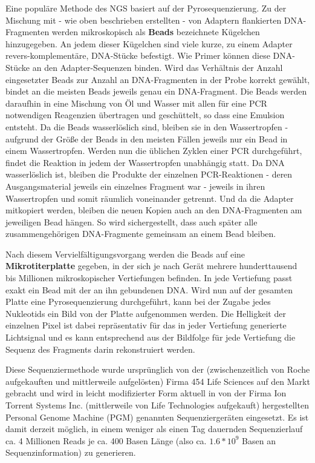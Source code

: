 Eine populäre Methode des NGS basiert auf der Pyrosequenzierung. Zu der Mischung mit - wie oben beschrieben erstellten - von Adaptern flankierten DNA-Fragmenten werden mikroskopisch als \textbf{Beads} bezeichnete Kügelchen hinzugegeben. An jedem dieser Kügelchen sind viele kurze, zu einem Adapter revers-komplementäre, DNA-Stücke befestigt. Wie Primer können diese DNA-Stücke an den Adapter-Sequenzen binden. Wird das Verhältnis der Anzahl eingesetzter Beads zur Anzahl an DNA-Fragmenten in der Probe korrekt gewählt, bindet an die meisten Beads jeweils genau ein DNA-Fragment. Die Beads werden daraufhin in eine Mischung von Öl und Wasser mit allen für eine PCR notwendigen Reagenzien übertragen und geschüttelt, so dass eine Emulsion entsteht. Da die Beads wasserlöslich sind, bleiben sie in den Wassertropfen - aufgrund der Größe der Beads in den meisten Fällen jeweils nur ein Bead in einem Wassertropfen. Werden nun die üblichen Zyklen einer PCR durchgeführt, findet die Reaktion in jedem der Wassertropfen unabhängig statt. Da DNA wasserlöslich ist, bleiben die Produkte der einzelnen PCR-Reaktionen - deren Ausgangsmaterial jeweils ein einzelnes Fragment war - jeweils in ihren Wassertropfen und somit räumlich voneinander getrennt. Und da die Adapter mitkopiert werden, bleiben die neuen Kopien auch an den DNA-Fragmenten am jeweiligen Bead hängen. So wird sichergestellt, dass auch später alle zusammengehörigen DNA-Fragmente gemeinsam an einem Bead bleiben. 

Nach diesem Vervielfältigungsvorgang werden die Beads auf eine \textbf{Mikrotiterplatte} gegeben, in der sich je nach Gerät mehrere hunderttausend bis Millionen mikroskopischer Vertiefungen befinden. In jede Vertiefung passt exakt ein Bead mit der an ihn gebundenen DNA. Wird nun auf der gesamten Platte eine Pyrosequenzierung durchgeführt, kann bei der Zugabe jedes Nukleotids ein Bild von der Platte aufgenommen werden. Die Helligkeit der einzelnen Pixel ist dabei repräsentativ für das in jeder Vertiefung generierte Lichtsignal und es kann entsprechend aus der Bildfolge für jede Vertiefung die Sequenz des Fragments darin rekonstruiert werden.  

Diese Sequenziermethode wurde ursprünglich von der (zwischenzeitlich von Roche aufgekauften und mittlerweile aufgelösten) Firma 454 Life Sciences auf den Markt gebracht und wird in leicht modifizierter Form aktuell in von der Firma Ion Torrent Systems Inc. (mittlerweile von Life Technologies aufgekauft) hergestellten Personal Genome Machine (PGM) genannten Sequenziergeräten eingesetzt. Es ist damit derzeit möglich, in einem weniger als einen Tag dauernden Sequenzierlauf ca. 4 Millionen Reads je ca. 400 Basen Länge (also ca. $1.6*10^9$ Basen an Sequenzinformation) zu generieren. 


